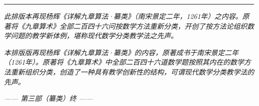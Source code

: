 \documentclass[11pt,a4paper]{article}
\newcommand{\longline}{\noindent\rule{\textwidth}{0.4pt}}
\newcommand{\bilingual}[2]{%
\noindent
\begin{minipage}[t]{0.45\textwidth}
\setlength{\parindent}{2em}\setlength{\parskip}{4pt}%
\small\color{prefacecolor}#1%
\end{minipage}%
\hfill
\begin{minipage}[t]{0.45\textwidth}
\setlength{\parindent}{2em}\setlength{\parskip}{4pt}%
\small#2%
\end{minipage}
\vspace{8pt}
}
\begin{document}
\vspace{1cm}
\longline

\vspace{1cm}

\bilingual{%
\noindent\textit{此排版本再现杨辉《详解九章算法·纂类》（南宋景定二年，1261年）之内容。原著将《九章算术》全部二百四十六问按数学方法重新分类，开创了按方法论组织数学问题的教学新体例，堪称现代数学分类教学法之先声。}
}{%
\noindent\textit{本排版版再现杨辉《详解九章算法·纂类》的内容，原著成书于南宋景定二年（1261年）。原著将《九章算术》中全部二百四十六道数学题按照其内在的数学方法重新组织分类，创造了一种具有教学创新性的结构，可谓现代数学分类教学法的先声。}
}

\vspace{1cm}

\begin{flushright}
\textit{—— 第三部（纂类）终 ——}
\end{flushright}
\end{document}

